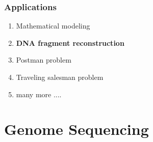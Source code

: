 \documentclass{beamer}
\begin{document}

\begin{frame}
\frametitle{Applications}
\begin{enumerate}
\item Mathematical modeling
\item {\color{red}\textbf{DNA fragment reconstruction}}
\item Postman problem
\item Traveling salesman problem

\item many more ....
\end{enumerate}
\end{frame}



\section{Genome Sequencing}

\end{document}
